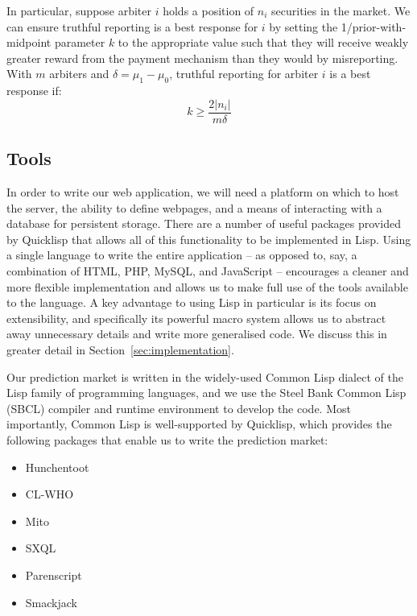 In particular, suppose arbiter $i$ holds a position of $n_i$ securities in the
market. We can ensure truthful reporting is a best response for $i$ by setting
the 1/prior-with-midpoint parameter $k$ to the appropriate value such that they
will receive weakly greater reward from the payment mechanism than they would
by misreporting. With $m$ arbiters and $\delta = \mu_1 - \mu_0$, truthful
reporting for arbiter $i$ is a best response if:
%
\begin{equation}
	\label{eq:kBoundN}
	k \ge \frac{2 |n_i|}{m \delta}
\end{equation}

\subsection{Tools}

In order to write our web application, we will need a platform on which to host
the server, the ability to define webpages, and a means of interacting with a
database for persistent storage. There are a number of useful packages provided
by Quicklisp that allows all of this functionality to be implemented in Lisp.
Using a single language to write the entire application -- as opposed to, say,
a combination of HTML, PHP, MySQL, and JavaScript -- encourages a cleaner and
more flexible implementation and allows us to make full use of the tools
available to the language. A key advantage to using Lisp in particular is its
focus on extensibility, and specifically its powerful macro system allows us to
abstract away unnecessary details and write more generalised code. We discuss
this in greater detail in Section~\ref{sec:implementation}.

Our prediction market is written in the widely-used Common Lisp dialect of the
Lisp family of programming languages, and we use the Steel Bank Common Lisp
(SBCL) compiler and runtime environment to develop the code. Most importantly,
Common Lisp is well-supported by Quicklisp, which provides the following
packages that enable us to write the prediction market:

\begin{itemize}
	\item Hunchentoot \cite{Hunchentoot}
	\item CL-WHO \cite{CL-WHO}
	\item Mito \cite{Mito}
	\item SXQL \cite{SXQL}
	\item Parenscript \cite{Parenscript}
	\item Smackjack \cite{Smackjack}
\end{itemize}

